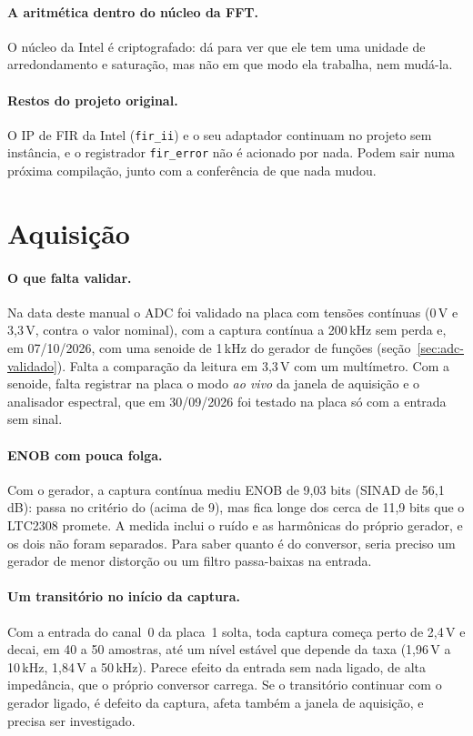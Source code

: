 \paragraph{A aritmética dentro do núcleo da FFT.} O núcleo da Intel é
criptografado: dá para ver que ele tem uma unidade de arredondamento e
saturação, mas não em que modo ela trabalha, nem mudá-la.

\paragraph{Restos do projeto original.} O IP de FIR da Intel (\texttt{fir\_ii})
e o seu adaptador continuam no projeto sem instância, e o registrador
\texttt{fir\_error} não é acionado por nada. Podem sair numa próxima
compilação, junto com a conferência de que nada mudou.

\section{Aquisição}

\paragraph{O que falta validar.} Na data deste manual o ADC foi validado na
placa com tensões contínuas (0\,V e 3,3\,V, contra o valor nominal), com a
captura contínua a 200\,kHz sem perda e, em 07/10/2026, com uma senoide de
1\,kHz do gerador de funções (seção~\ref{sec:adc-validado}). Falta a comparação
da leitura em 3,3\,V com um multímetro. Com a senoide, falta registrar na placa
o modo \emph{ao vivo} da janela de aquisição e o analisador espectral, que em
30/09/2026 foi testado na placa só com a entrada sem sinal.

\paragraph{ENOB com pouca folga.} Com o gerador, a captura contínua mediu
ENOB de 9,03 bits (SINAD de 56,1\,dB): passa no critério do
 (acima de 9), mas fica longe dos cerca de 11,9 bits que o
LTC2308 promete. A medida inclui o ruído e as harmônicas do próprio gerador, e
os dois não foram separados. Para saber quanto é do conversor, seria preciso
um gerador de menor distorção ou um filtro passa-baixas na entrada.

\paragraph{Um transitório no início da captura.} Com a entrada do canal~0 da
placa~1 solta, toda captura começa perto de 2,4\,V e decai, em 40 a 50
amostras, até um nível estável que depende da taxa (1,96\,V a 10\,kHz, 1,84\,V a
50\,kHz). Parece efeito da entrada sem nada ligado, de alta impedância, que o
próprio conversor carrega. Se o transitório continuar com o gerador ligado, é
defeito da captura, afeta também a janela de aquisição, e precisa ser
investigado.


